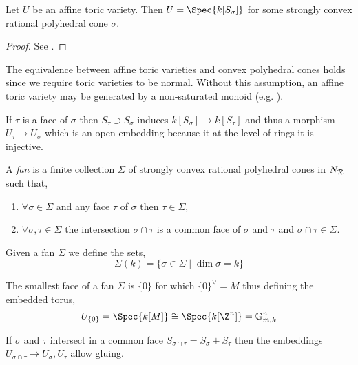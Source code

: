 \begin{theorem}
Let $U$ be an affine toric variety. Then $U = \Spec{k[S_\sigma]}$ for some strongly convex rational polyhedral cone $\sigma$.
\end{theorem}

\begin{proof}
See \cite[Thm. 1.3.5]{cox}.
\end{proof}

\begin{rmk}
The equivalence between affine toric varieties and convex polyhedral cones holds since we require toric varieties to be normal. Without this assumption, an affine toric variety may be generated by a non-saturated monoid (e.g. \cite[Ex. 1.10]{cox_lectures}).
\end{rmk}

\begin{remark}
If $\tau$ is a face of $\sigma$ then $S_\tau \supset S_\sigma$ induces $k[S_\sigma] \to k[S_\tau]$ and thus a morphism $U_\tau \to U_\sigma$ which is an open embedding because it at the level of rings it is injective. 
\end{remark}

\begin{definition}
A \textit{fan} is a finite collection $\Sigma$ of strongly convex rational polyhedral cones in $N_{\mathcal{R}}$ such that,
\begin{enumerate}
\item $\forall \sigma \in \Sigma$ and any face $\tau$ of $\sigma$ then $\tau \in \Sigma$,
\item $\forall \sigma, \tau \in \Sigma$ the intersection $\sigma \cap \tau$ is a common face of $\sigma$ and $\tau$ and $\sigma \cap \tau \in \Sigma$.
\end{enumerate}
Given a fan $\Sigma$ we define the sets,
\[ \Sigma(k) = \{ \sigma \in \Sigma \mid \dim{\sigma} = k \} \]
\end{definition}

\begin{remark}
The smallest face of a fan $\Sigma$ is $\{ 0 \}$ for which $\{ 0 \}^\vee = M$ thus defining the embedded torus,
\[ U_{\{0\}} = \Spec{k[M]} \cong \Spec{k[\Z^n]} = \mathbb{G}_{m,k}^n \]
\end{remark}

\begin{remark}
If $\sigma$ and $\tau$ intersect in a common face $S_{\sigma \cap \tau} = S_\sigma + S_\tau$ then the embeddings $U_{\sigma \cap \tau} \to U_{\sigma}, U_{\tau}$ allow gluing. 
\end{remark}


